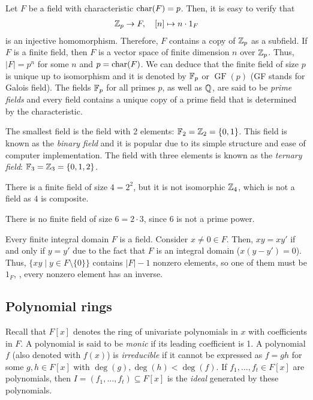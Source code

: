 \documentclass[../main.tex]{subfiles}
\begin{document}
Let $F$ be a field with characteristic $\operatorname{char}(F) = p$. Then, it is easy to verify that
\begin{align*}
    \mathbb{Z}_p \to F, \quad [n] \mapsto n \cdot 1_F
\end{align*}
is an injective homomorphism. Therefore, $F$ contains a copy of $\mathbb{Z}_p$ as a subfield. If $F$ is a finite field, then $F$ is a vector space of finite dimension $n$ over $\mathbb{Z}_p$. Thus, $\lvert F \rvert = p^n$ for some $n$ and $p = \operatorname{char}(F)$. We can deduce that the finite field of size $p$ is unique up to isomorphism and it is denoted by $\mathbb{F}_p$ or $\operatorname{GF}(p)$ (GF stands for Galois field). The fields $\mathbb{F}_p$ for all primes $p$, as well as $\mathbb{Q}$, are said to be \emph{prime fields} and every field contains a unique copy of a prime field that is determined by the characteristic.

\begin{example}
The smallest field is the field with 2 elements: $\mathbb{F}_2 = \mathbb{Z}_2 = \{0, 1\}$. This field is known as the \emph{binary field} and it is popular due to its simple structure and ease of computer implementation. The field with three elements is known as the \emph{ternary field}: $\mathbb{F}_3 = \mathbb{Z}_3 = \{0, 1, 2\}$.

There is a finite field of size $4 = 2^2$, but it is not isomorphic $\mathbb{Z}_4$, which is not a field as $4$ is composite.

There is no finite field of size $6 = 2 \cdot 3$, since $6$ is not a prime power.
\end{example}

\begin{example}
Every finite integral domain $F$ is a field. Consider $x \neq 0 \in F$. Then, $xy = xy'$ if and only if $y = y'$ due to the fact that $F$ is an integral domain ($x(y - y') = 0$). Thus, $\{xy \mid y \in F \setminus \{0\} \}$ contains $\lvert F \rvert - 1$ nonzero elements, so one of them must be $1_F$, \ie, every nonzero element has an inverse.
\end{example}

\subsection{Polynomial rings}

Recall that $F[x]$ denotes the ring of univariate polynomials in $x$ with coefficients in $F$. A polynomial is said to be \emph{monic} if its leading coefficient is 1. A polynomial $f$ (also denoted with $f(x)$) is \emph{irreducible} if it cannot be expressed as $f = gh$ for some $g, h \in F[x]$ with $\deg(g), \deg(h) < \deg(f)$. If $f_1, \dots, f_t \in F[x]$ are polynomials, then $I = (f_1, \dots, f_t) \subseteq F[x]$ is the \emph{ideal} generated by these polynomials.
\end{document}
